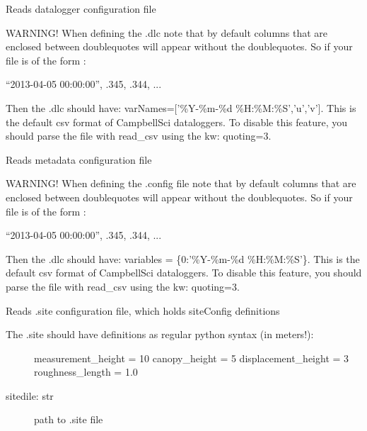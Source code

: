 \documentclass[a4paper,10pt,english]{sphinxmanual}
\begin{document}

\begin{fulllineitems}
\label{pymicra:pymicra.io.read_dlc}
Reads datalogger configuration file

WARNING! When defining the .dlc note that by default columns that are enclosed between doublequotes
will appear without the doublequotes. So if your file is of the form :

``2013-04-05 00:00:00'', .345, .344, ...

Then the .dlc should have: varNames={[}'\%Y-\%m-\%d \%H:\%M:\%S','u','v'{]}. This is the default csv format of
CampbellSci dataloggers. To disable this feature, you should parse the file with read\_csv using the kw: quoting=3.

\end{fulllineitems}


\begin{fulllineitems}
\label{pymicra:pymicra.io.read_fileConfig}
Reads metadata configuration file

WARNING! When defining the .config file note that by default columns that are enclosed between doublequotes
will appear without the doublequotes. So if your file is of the form :

``2013-04-05 00:00:00'', .345, .344, ...

Then the .dlc should have: variables = \{0:'\%Y-\%m-\%d \%H:\%M:\%S'\}. This is the default csv format of
CampbellSci dataloggers. To disable this feature, you should parse the file with read\_csv using the kw: quoting=3.

\end{fulllineitems}


\begin{fulllineitems}
\label{pymicra:pymicra.io.read_site}
Reads .site configuration file, which holds siteConfig definitions
\begin{description}
\item[{The .site should have definitions as regular python syntax (in meters!):}] \leavevmode
measurement\_height  = 10
canopy\_height       = 5
displacement\_height = 3
roughness\_length    = 1.0

\item[{sitedile: str}] \leavevmode
path to .site file

\end{description}

\end{fulllineitems}
\end{document}
